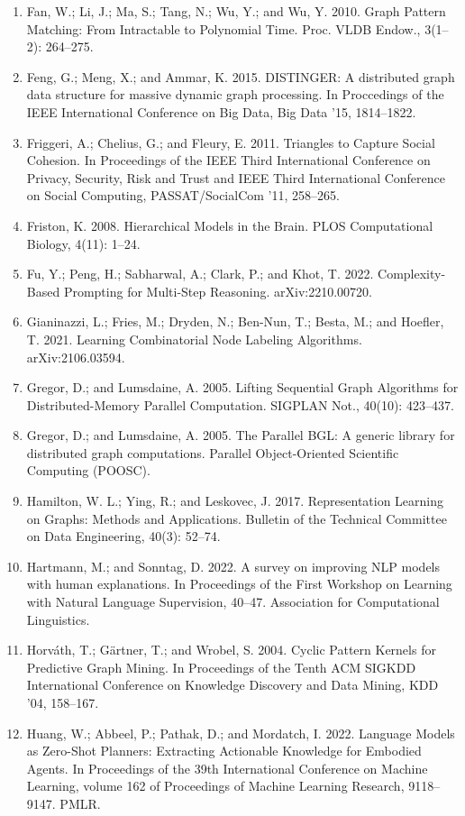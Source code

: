 \documentclass[11pt,UTF8,fontset=fandol]{ctexart}
\begin{document}
\begin{enumerate}[leftmargin=2em]
\item Fan, W.; Li, J.; Ma, S.; Tang, N.; Wu, Y.; and Wu, Y. 2010. Graph Pattern Matching: From Intractable to Polynomial Time. Proc. VLDB Endow., 3(1--2): 264--275.
\item Feng, G.; Meng, X.; and Ammar, K. 2015. DISTINGER: A distributed graph data structure for massive dynamic graph processing. In Proccedings of the IEEE International Conference on Big Data, Big Data '15, 1814--1822.
\item Friggeri, A.; Chelius, G.; and Fleury, E. 2011. Triangles to Capture Social Cohesion. In Proceedings of the IEEE Third International Conference on Privacy, Security, Risk and Trust and IEEE Third International Conference on Social Computing, PASSAT/SocialCom '11, 258--265.
\item Friston, K. 2008. Hierarchical Models in the Brain. PLOS Computational Biology, 4(11): 1--24.
\item Fu, Y.; Peng, H.; Sabharwal, A.; Clark, P.; and Khot, T. 2022. Complexity-Based Prompting for Multi-Step Reasoning. arXiv:2210.00720.
\item Gianinazzi, L.; Fries, M.; Dryden, N.; Ben-Nun, T.; Besta, M.; and Hoefler, T. 2021. Learning Combinatorial Node Labeling Algorithms. arXiv:2106.03594.
\item Gregor, D.; and Lumsdaine, A. 2005. Lifting Sequential Graph Algorithms for Distributed-Memory Parallel Computation. SIGPLAN Not., 40(10): 423--437.
\item Gregor, D.; and Lumsdaine, A. 2005. The Parallel BGL: A generic library for distributed graph computations. Parallel Object-Oriented Scientific Computing (POOSC).
\item Hamilton, W. L.; Ying, R.; and Leskovec, J. 2017. Representation Learning on Graphs: Methods and Applications. Bulletin of the Technical Committee on Data Engineering, 40(3): 52--74.
\item Hartmann, M.; and Sonntag, D. 2022. A survey on improving NLP models with human explanations. In Proceedings of the First Workshop on Learning with Natural Language Supervision, 40--47. Association for Computational Linguistics.
\item Horváth, T.; Gärtner, T.; and Wrobel, S. 2004. Cyclic Pattern Kernels for Predictive Graph Mining. In Proceedings of the Tenth ACM SIGKDD International Conference on Knowledge Discovery and Data Mining, KDD '04, 158--167.
\item Huang, W.; Abbeel, P.; Pathak, D.; and Mordatch, I. 2022. Language Models as Zero-Shot Planners: Extracting Actionable Knowledge for Embodied Agents. In Proceedings of the 39th International Conference on Machine Learning, volume 162 of Proceedings of Machine Learning Research, 9118--9147. PMLR.

\end{enumerate}
\end{document}
